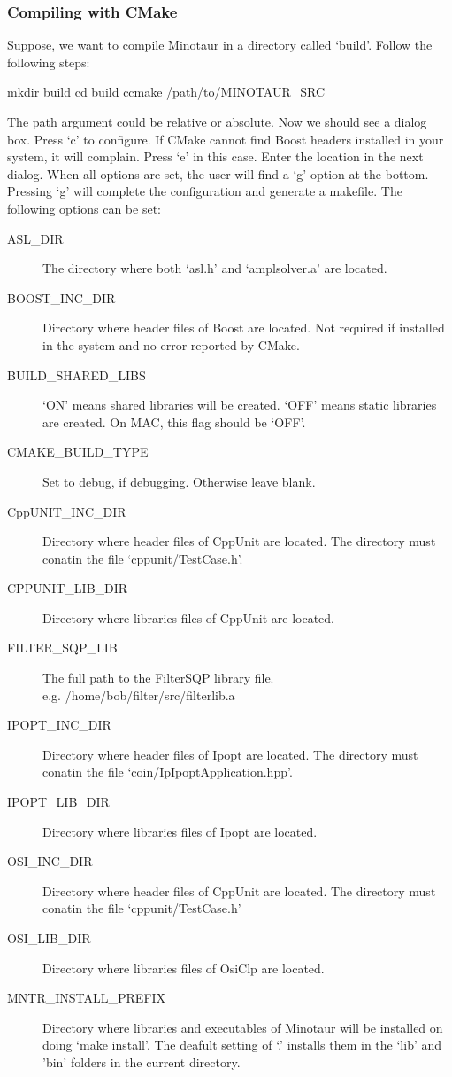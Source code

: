 \subsubsection{Compiling with CMake}
\label{sec:compile_cmake}
Suppose, we want to compile Minotaur in a directory called `build'. Follow the
following steps:
\begin{codeenv}
mkdir build
cd build
ccmake /path/to/MINOTAUR_SRC
\end{codeenv}
The path argument could be relative or absolute. Now we should see a dialog
box. Press `c' to configure. If CMake cannot find Boost headers installed in
your system, it will complain. Press `e' in this case. Enter the location in
the next dialog. When all options are set, the user will find a `g' option at
the bottom. Pressing `g' will complete the configuration and generate a
makefile. The following options can be set:
\begin{description}
\item[ASL\_DIR] The directory where both `asl.h' and `amplsolver.a' are
located.
\item[BOOST\_INC\_DIR] Directory where header files of Boost are located.
Not required if installed in the system and no error reported by CMake.
\item[BUILD\_SHARED\_LIBS] `ON' means shared libraries will be created. `OFF'
means static libraries are created. On MAC, this flag should be `OFF'.
\item[CMAKE\_BUILD\_TYPE] Set to debug, if debugging. Otherwise leave blank.
\item[CppUNIT\_INC\_DIR] Directory where header files of CppUnit are located.
The directory must conatin the file `cppunit/TestCase.h'.
\item[CPPUNIT\_LIB\_DIR] Directory where libraries files of CppUnit are located.
\item[FILTER\_SQP\_LIB] The full path to the FilterSQP library file. \\
e.g. /home/bob/filter/src/filterlib.a
\item[IPOPT\_INC\_DIR] Directory where header files of Ipopt are located.
The directory must conatin the file `coin/IpIpoptApplication.hpp'.
\item[IPOPT\_LIB\_DIR] Directory where libraries files of Ipopt are located.
\item[OSI\_INC\_DIR] Directory where header files of CppUnit are located.
The directory must conatin the file `cppunit/TestCase.h'
\item[OSI\_LIB\_DIR] Directory where libraries files of OsiClp are located.
\item[MNTR\_INSTALL\_PREFIX] Directory where libraries and executables of Minotaur
will be installed on doing `make install'. The deafult setting of `.' installs
them in the `lib' and 'bin' folders in the current directory.
\end{description}

